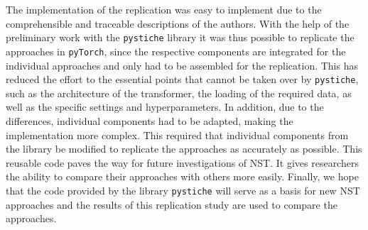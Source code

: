 The implementation of the replication was easy to implement due to the comprehensible and traceable descriptions of the authors. With the help of the preliminary work with the \texttt{pystiche} library it was thus possible to replicate the approaches in \texttt{pyTorch}, since the respective components are integrated for the individual approaches and only had to be assembled for the replication. This has reduced the effort to the essential points that cannot be taken over by \texttt{pystiche}, such as the architecture of the transformer, the loading of the required data, as well as the specific settings and hyperparameters. In addition, due to the differences, individual components had to be adapted, making the implementation more complex. This required that individual components from the library be modified to replicate the approaches as accurately as possible. This reusable code paves the way for future investigations of NST. It gives researchers the ability to compare their approaches with others more easily. Finally, we hope that the code provided by the library \texttt{pystiche} will serve as a basis for new  NST approaches and the results of this replication study are used to compare the approaches.







